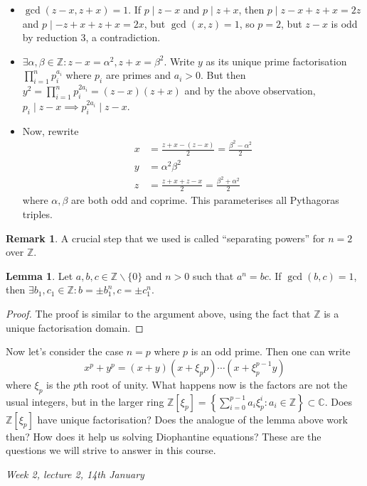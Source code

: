 \documentclass{article}
\newcommand{\Z}{\mathbb{Z}}
\newcommand{\C}{\mathbb{C}}
\theoremstyle{definition}
\newtheorem{lemma}[defn]{Lemma}
\newtheorem{remark}[defn]{Remark}
\begin{document}
\begin{itemize}
\item $\gcd(z-x,z+x)=1$. If $p\mid z-x$ and $p\mid z+x$, then $p\mid z-x+z+x=2z$ and $p\mid -z+x+z+x=2x$, but $\gcd(x,z)=1$, so $p=2$, but $z-x$ is odd by reduction 3, a contradiction.
\item $\exists\alpha,\beta\in\Z:z-x=\alpha^2,z+x=\beta^2$. Write $y$ as its unique prime factorisation $\prod_{i=1}^n p_i^{a_i}$ where $p_i$ are primes and $a_i>0$. But then $y^2=\prod_{i=1}^n p_i^{2a_i}=(z-x)(z+x)$ and by the above observation, $p_i\mid z-x\implies p_i^{2a_i}\mid z-x$.
\item Now, rewrite
\[
\begin{aligned}
x&=\frac{z+x-(z-x)}{2}=\frac{\beta^2-\alpha^2}{2}\\
y&=\alpha^2\beta^2\\
z&=\frac{z+x+z-x}{2}=\frac{\beta^2+\alpha^2}{2}
\end{aligned}
\]
where $\alpha,\beta$ are both odd and coprime. This parameterises all Pythagoras triples.
\end{itemize}

\begin{remark}
A crucial step that we used is called ``separating powers'' for $n=2$ over $\Z$.

\begin{lemma}
Let $a,b,c\in\Z\backslash\{0\}$ and $n>0$ such that $a^n=bc$. If $\gcd(b,c)=1$, then $\exists b_1,c_1\in\Z:b=\pm b_1^n, c=\pm c_1^n$.
\end{lemma}
\begin{proof}
The proof is similar to the argument above, using the fact that $\Z$ is a unique factorisation domain.
\end{proof}

Now let's consider the case $n=p$ where $p$ is an odd prime. Then one can write
\[
x^p+y^p=(x+y)(x+\xi_p p)\cdots (x+\xi_p^{p-1}y)
\]
where $\xi_p$ is the $p$th root of unity. What happens now is the factors are not the usual integers, but in the larger ring $\Z[\xi_p]=\left\{\sum_{i=0}^{p-1}a_i\xi_p^i:a_i\in\Z\right\}\subset\C$. Does $\Z[\xi_p]$ have unique factorisation? Does the analogue of the lemma above work then? How does it help us solving Diophantine equations? These are the questions we will strive to answer in this course.
\end{remark}

\begin{flushright}
\textit{Week 2, lecture 2, 14th January}
\end{flushright}
\end{document}
